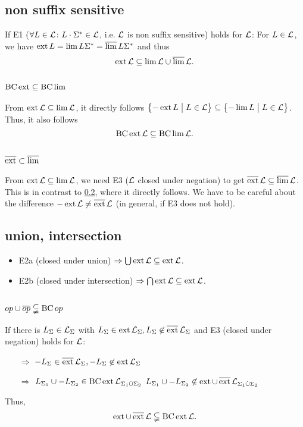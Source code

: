 \subsection{non suffix sensitive}
\label{gen:non-suffix-sens}

If E1 ($\forall L \in \mathcal{L} \colon L \cdot \Sigma^* \in \mathcal{L}$, i.e. $\mathcal{L}$ is non suffix sensitive) holds for $\mathcal{L}$: For $L \in \mathcal{L}$, we have $\operatorname{ext} L = \lim L \Sigma^* = \operatorname{\overline{lim}} L \Sigma^*$ and thus
\[ \operatorname{ext} \mathcal{L} \subseteq \lim \mathcal{L} \cup \operatorname{\overline{lim}} \mathcal{L} . \]

\subsection{$\operatorname{BC} \operatorname{ext} \subseteq \operatorname{BC} \lim$}
\label{gen:S302a}

From $\operatorname{ext} \mathcal{L} \subseteq \lim \mathcal{L}$, it directly follows $\Set{-\ext L}{L \in \Lang} \subseteq \Set{-\lim L}{L \in \Lang}$. Thus, it also follows
\[ \operatorname{BC} \operatorname{ext} \mathcal{L} \subseteq \operatorname{BC} \lim \mathcal{L} . \]

\subsection{$\operatorname{\overline{ext}} \subset \operatorname{\overline{lim}}$}

From $\operatorname{ext} \mathcal{L} \subseteq \lim \mathcal{L}$, we need E3 ($\mathcal{L}$ closed under negation) to get $\operatorname{\overline{ext}} \mathcal{L} \subseteq \operatorname{\overline{lim}} \mathcal{L}$. This is in contrast to \ref{gen:S302a}, where it directly follows. We have to be careful about the difference $- \operatorname{ext} \mathcal{L} \neq \operatorname{\overline{ext}} \mathcal{L}$ (in general, if E3 does not hold). 

\subsection{union, intersection}
\begin{itemize}
\item
E2a (closed under union) $\Rightarrow \bigcup \operatorname{ext} \mathcal{L} \subseteq \operatorname{ext} \mathcal{L}$.
\item
E2b (closed under intersection) $\Rightarrow \bigcap \operatorname{ext} \mathcal{L} \subseteq \operatorname{ext} \mathcal{L}$.
\end{itemize}

\subsection{$op \cup \overline{op} \subsetneqq \operatorname{BC} op$}
If there is $L_\Sigma \in \mathcal{L}_\Sigma$ with $L_\Sigma \in \operatorname{ext} \mathcal{L}_\Sigma, L_\Sigma \not\in \operatorname{\overline{ext}} \mathcal{L}_\Sigma$ and E3 (closed under negation) holds for $\mathcal{L}$:
\begin{itemize}
\item[$\Rightarrow$] $-L_\Sigma \in \operatorname{\overline{ext}} \mathcal{L}_\Sigma, -L_\Sigma \not\in \operatorname{ext} \mathcal{L}_\Sigma$
\item[$\Rightarrow$] $L_{\Sigma_1} \cup -L_{\Sigma_2} \in \operatorname{BC} \operatorname{ext} \mathcal{L}_{\Sigma_1 \dot{\cup} \Sigma_2}$ \newline
$L_{\Sigma_1} \cup -L_{\Sigma_2} \not\in \operatorname{ext} \cup \operatorname{\overline{ext}} \mathcal{L}_{\Sigma_1 \dot{\cup} \Sigma_2}$
\end{itemize}
Thus,
\[ \operatorname{ext} \cup \operatorname{\overline{ext}} \mathcal{L} \subsetneqq \operatorname{BC} \operatorname{ext} \mathcal{L} . \]

